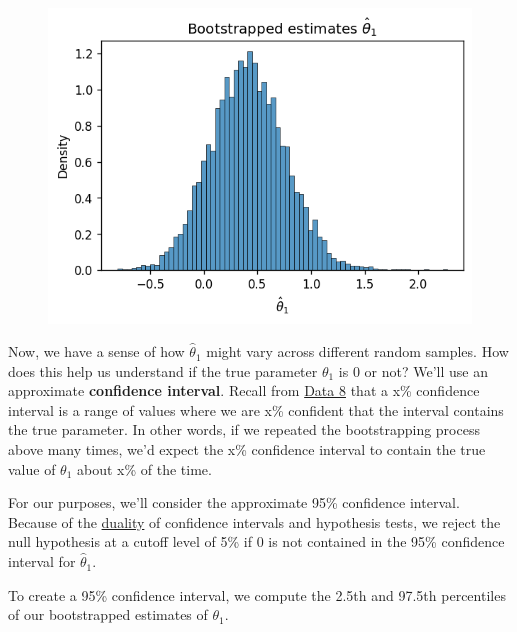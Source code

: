\documentclass[
  letterpaper,
  DIV=11,
  numbers=noendperiod]{scrreprt}
\begin{document}
\begin{figure}[H]

{\centering \includegraphics{inference_causality/inference_causality_files/figure-pdf/cell-5-output-1.png}

}

\end{figure}

Now, we have a sense of how \(\hat{\theta}_1\) might vary across
different random samples. How does this help us understand if the true
parameter \(\theta_1\) is 0 or not? We'll use an approximate
\textbf{confidence interval}. Recall from
\href{https://inferentialthinking.com/chapters/13/3/Confidence_Intervals.html?}{Data
8} that a x\% confidence interval is a range of values where we are x\%
confident that the interval contains the true parameter. In other words,
if we repeated the bootstrapping process above many times, we'd expect
the x\% confidence interval to contain the true value of \(\theta_1\)
about x\% of the time.

For our purposes, we'll consider the approximate 95\% confidence
interval. Because of the
\href{https://inferentialthinking.com/chapters/13/4/Using_Confidence_Intervals.html\#using-a-confidence-interval-to-test-hypotheses}{duality}
of confidence intervals and hypothesis tests, we reject the null
hypothesis at a cutoff level of 5\% if 0 is not contained in the 95\%
confidence interval for \(\hat{\theta}_1\).

To create a 95\% confidence interval, we compute the 2.5th and 97.5th
percentiles of our bootstrapped estimates of \(\theta_1\).
\end{document}
